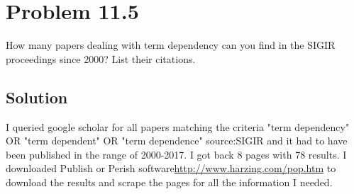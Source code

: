 \documentclass[letterpaper,12pt]{article}
\begin{document}
\section{Problem 11.5}
How many papers dealing with term dependency can you find in the SIGIR proceedings since 2000? List their citations.

\subsection{Solution}

I queried google scholar for all papers matching the criteria "term dependency" OR "term dependent" OR "term dependence" source:SIGIR and it had to have been published in the range of 2000-2017. I got back 8 pages with 78 results. I downloaded Publish or Perish software\url{http://www.harzing.com/pop.htm} to download the results and scrape the pages for all the information I needed.
\end{document}
